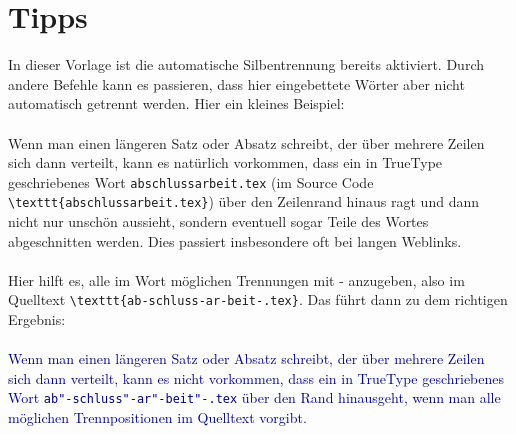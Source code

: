 \section{Tipps}
\label{sec:tipps}
%
In dieser Vorlage ist die automatische Silbentrennung bereits aktiviert. Durch andere Befehle kann es passieren, dass hier eingebettete Wörter aber nicht automatisch getrennt werden. Hier ein kleines Beispiel:\\
\\
Wenn man einen längeren Satz oder Absatz schreibt, der über mehrere Zeilen sich dann verteilt, kann es natürlich vorkommen, dass ein in TrueType geschriebenes Wort \texttt{abschlussarbeit.tex} (im Source Code \texttt{\textbackslash texttt\{abschlussarbeit.tex\}}) über den Zeilenrand hinaus ragt und dann nicht nur unschön aussieht, sondern eventuell sogar Teile des Wortes abgeschnitten werden. Dies passiert insbesondere oft bei langen Weblinks.\\
\\
Hier hilft es, alle im Wort möglichen Trennungen mit \dq- anzugeben, also im Quelltext \texttt{\textbackslash texttt\{ab\dq-schluss\dq-ar\dq-beit\dq-.tex\}}. Das führt dann zu dem richtigen Ergebnis:\\
\\
\textcolor{darkblue}{Wenn man einen längeren Satz oder Absatz schreibt, der über mehrere Zeilen sich dann verteilt, kann es nicht vorkommen, dass ein in TrueType geschriebenes Wort \texttt{ab"-schluss"-ar"-beit"-.tex} über den Rand hinausgeht, wenn man alle möglichen Trennpositionen im Quelltext vorgibt.}\\
\\
